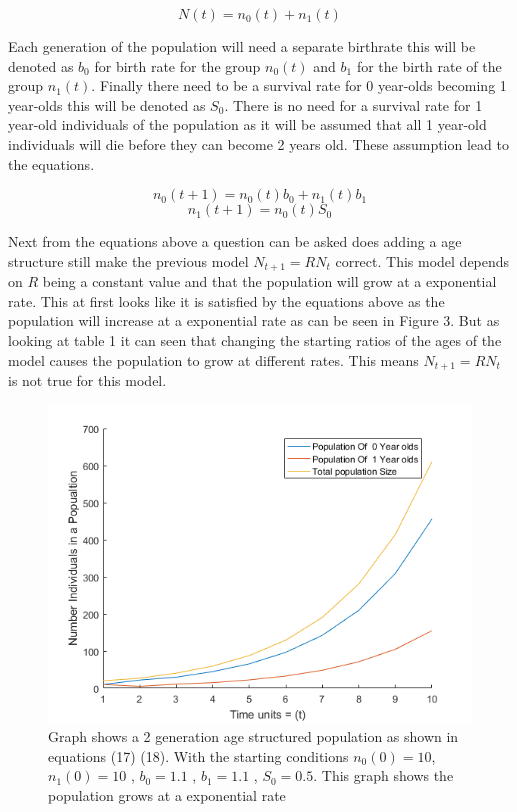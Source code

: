 \documentclass[final]{cmpreport}
\begin{document}
	\begin{equation}
	N(t) =n_0(t)+n_1(t) 
	\end{equation}
	
	Each generation of the population will need a separate birthrate this will be denoted as $b_0$ for birth rate for the group $n_0(t)$  and  $b_1$ for the birth rate of the group  $n_1(t)$. Finally there need to be a survival rate for 0 year-olds becoming 1 year-olds this will be denoted as  $S_0$. There is no need for a survival rate for 1 year-old individuals of the population as it will be assumed that all 1 year-old individuals will die before they can become 2 years old. These assumption lead to the equations.
	
	\begin{equation}
	 n_0(t+1) = n_0(t)b_0 + n_1(t)b_1
	\end{equation}
	\begin{equation}
	 n_1(t+1) = n_0(t)S_0
	\end{equation}
	
	Next from the equations above a question can be asked does adding a age structure still make the previous model $N_{t+1}=RN_t$ correct. This model depends on $R$ being a constant value and that the population will grow at a exponential rate. This at first looks like it is satisfied by the equations above as the population will increase at a exponential rate as can be seen in Figure 3. But as looking at table 1 it can seen that changing the starting ratios of the ages of the model causes the population to grow at different rates. This means $N_{t+1}=RN_t$ is not true for this model.
	
	\begin{figure}[h!]
		\includegraphics[width=\textwidth]{ageStructure.png}
		\caption{Graph shows a 2 generation age structured population as shown in equations (17) (18). With the starting conditions $n_0(0) =10$,$n_1(0) =10$  , $b_0 = 1.1$ , $b_1 = 1.1$ , $S_0=0.5$. This graph shows the population grows at a exponential rate}
	\end{figure}
\end{document}
